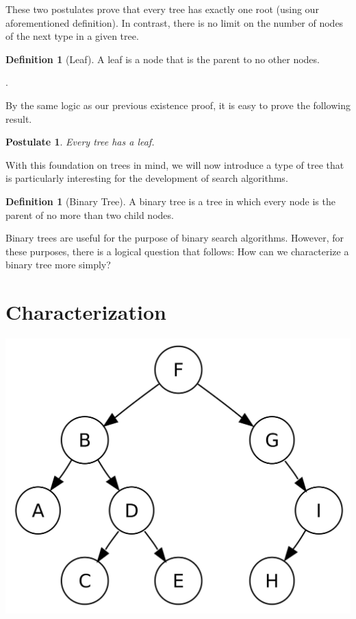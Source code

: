 \documentclass[12pt]{article}
\newtheorem{postulate}{Postulate}[section]
\theoremstyle{definition}
\newtheorem{definition}[theorem]{Definition}
\theoremstyle{remark}
\begin{document}
These two postulates prove that every tree has exactly one root (using our aforementioned definition). In contrast, there is no limit on the number of nodes of the next type in a given tree.

\begin{definition}[Leaf]
A leaf is a node that is the parent to no other nodes.
\end{definition}.

By the same logic as our previous existence proof, it is easy to prove the following result.

\begin{postulate}
Every tree has a leaf.
\end{postulate}

With this foundation on trees in mind, we will now introduce a type of tree that is particularly interesting for the development of search algorithms.

\begin{definition}[Binary Tree]
A binary tree is a tree in which every node is the parent of no more than two child nodes.
\end{definition}

Binary trees are useful for the purpose of binary search algorithms. However, for these purposes, there is a logical question that follows: How can we characterize a binary tree more simply?

\section{Characterization}
\includegraphics[scale=.125]{Binary}
\end{document}
